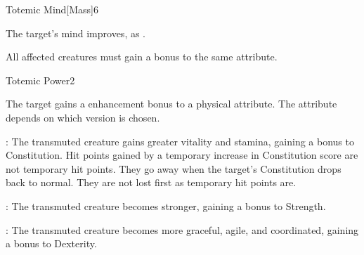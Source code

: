\begin{spellsection}{Totemic Mind}[Mass]{6}
\begin{spellheader}
    \begin{spelltargetinginfo}
    \end{spelltargetinginfo}
\end{spellheader}
\begin{spellcontent}
    \begin{spelleffects}
        \spelleffect The target's mind improves, as . 
    \end{spelleffects}
\end{spellcontent}
\begin{spellfooter}
    \spellnotes All affected creatures must gain a bonus to the same attribute.
\end{spellfooter}
\end{spellsection}

\begin{spellsection}{Totemic Power}{2}
\begin{spellheader}
    \begin{spelltargetinginfo}
    \end{spelltargetinginfo}
\end{spellheader}
\begin{spellcontent}
    \begin{spelleffects}
        \spelleffect The target gains a  enhancement bonus to a physical attribute. The attribute depends on which version is chosen.
        \par {}: The transmuted creature gains greater vitality and stamina, gaining a bonus to Constitution. Hit points gained by a temporary increase in Constitution score are not temporary hit points. They go away when the target's Constitution drops back to normal. They are not lost first as temporary hit points are.
        \par {}: The transmuted creature becomes stronger, gaining a bonus to Strength.
        \par {}: The transmuted creature becomes more graceful, agile, and coordinated, gaining a bonus to Dexterity.
        \spelldur \durshort
    \end{spelleffects}
\end{spellcontent}
\begin{spellfooter}
\end{spellfooter}
\end{spellsection}

